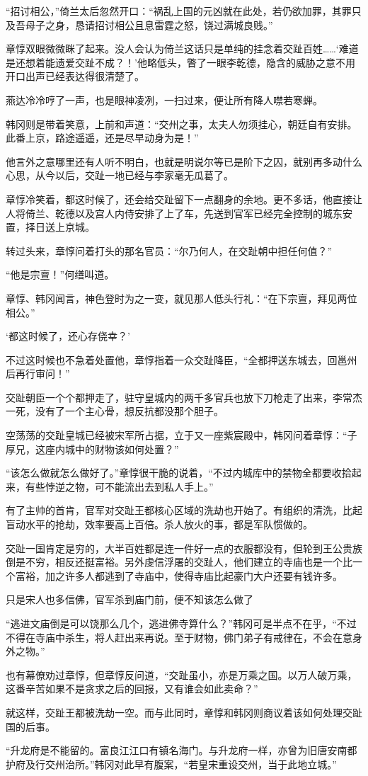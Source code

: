“招讨相公，”倚兰太后忽然开口：“祸乱上国的元凶就在此处，若仍欲加罪，其罪只及吾母子之身，恳请招讨相公且息雷霆之怒，饶过满城良贱。”

章惇双眼微微眯了起来。没人会认为倚兰这话只是单纯的挂念着交趾百姓……‘难道是还想着能遗爱交趾不成？！’他略低头，瞥了一眼李乾德，隐含的威胁之意不用开口出声已经表达得很清楚了。

燕达冷冷哼了一声，也是眼神凌冽，一扫过来，便让所有降人噤若寒蝉。

韩冈则是带着笑意，上前和声道：“交州之事，太夫人勿须挂心，朝廷自有安排。此番上京，路途遥遥，还是尽早动身为是！”

他言外之意哪里还有人听不明白，也就是明说尔等已是阶下之囚，就别再多动什么心思，从今以后，交趾一地已经与李家毫无瓜葛了。

章惇冷笑着，都这时候了，还会给交趾留下一点翻身的余地。更不多话，他直接让人将倚兰、乾德以及宫人内侍安排了上了车，先送到官军已经完全控制的城东安置，择日送上京城。

转过头来，章惇问着打头的那名官员：“尔乃何人，在交趾朝中担任何值？”

“他是宗亶！”何缮叫道。

章惇、韩冈闻言，神色登时为之一变，就见那人低头行礼：“在下宗亶，拜见两位相公。”

‘都这时候了，还心存侥幸？’

不过这时候也不急着处置他，章惇指着一众交趾降臣，“全都押送东城去，回邕州后再行审问！”

交趾朝臣一个个都押走了，驻守皇城内的两千多官兵也放下刀枪走了出来，李常杰一死，没有了一个主心骨，想反抗都没那个胆子。

空荡荡的交趾皇城已经被宋军所占据，立于又一座紫宸殿中，韩冈问着章惇：“子厚兄，这座内城中的财物该如何处置？”

“该怎么做就怎么做好了。”章惇很干脆的说着，“不过内城库中的禁物全都要收拾起来，有些悖逆之物，可不能流出去到私人手上。”

有了主帅的首肯，官军对交趾王都核心区域的洗劫也开始了。有组织的清洗，比起盲动水平的抢劫，效率要高上百倍。杀人放火的事，都是军队惯做的。

交趾一国肯定是穷的，大半百姓都是连一件好一点的衣服都没有，但轮到王公贵族倒是不穷，相反还挺富裕。另外虔信浮屠的交趾人，他们建立的寺庙也是一个比一个富裕，加之许多人都逃到了寺庙中，使得寺庙比起豪门大户还要有钱许多。

只是宋人也多信佛，官军杀到庙门前，便不知该怎么做了

“逃进文庙倒是可以饶那么几个，逃进佛寺算什么？”韩冈可是半点不在乎，“不过不得在寺庙中杀生，将人赶出来再说。至于财物，佛门弟子有戒律在，不会在意身外之物。”

也有幕僚劝过章惇，但章惇反问道，“交趾虽小，亦是万乘之国。以万人破万乘，这番辛苦如果不是贪求之后的回报，又有谁会如此卖命？”

就这样，交趾王都被洗劫一空。而与此同时，章惇和韩冈则商议着该如何处理交趾国的后事。

“升龙府是不能留的。富良江江口有镇名海门。与升龙府一样，亦曾为旧唐安南都护府及行交州治所。”韩冈对此早有腹案，“若皇宋重设交州，当于此地立城。”

